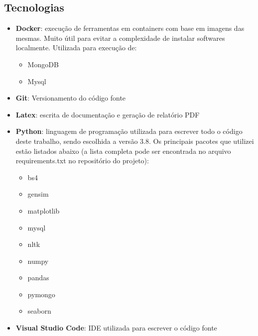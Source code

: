 \subsection{Tecnologias}

\begin{itemize}
    \item \textbf{Docker}: execução de ferramentas em containers com base em imagens das mesmas. Muito útil para evitar a complexidade de instalar softwares 
    localmente. Utilizada para execução de:
        \begin{itemize}
            \item MongoDB
            \item Mysql
        \end{itemize}
    \item \textbf{Git}: Versionamento do código fonte
    \item \textbf{Latex}: escrita de documentação e geração de relatório PDF
    \item \textbf{Python}: linguagem de programação utilizada para escrever todo o código deste trabalho, sendo escolhida a versão 3.8. Os principais pacotes que 
    utilizei estão listados abaixo (a lista completa pode ser encontrada no arquivo requirements.txt no repositório do projeto):
        \begin{itemize}
            \item bs4
            \item gensim
            \item matplotlib
            \item mysql
            \item nltk
            \item numpy
            \item pandas
            \item pymongo
            \item seaborn
        \end{itemize}
    \item \textbf{Visual Studio Code}: IDE utilizada para escrever o código fonte 
\end{itemize}